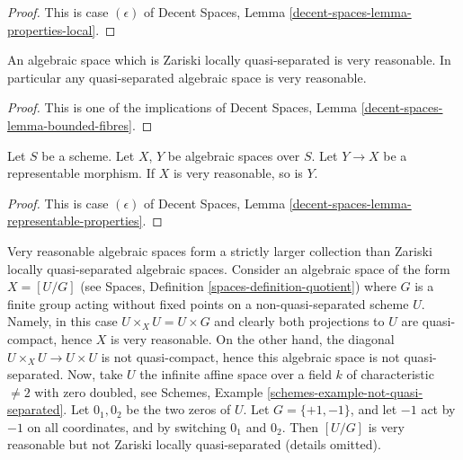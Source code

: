 \begin{proof}
This is case $(\epsilon)$ of
Decent Spaces, Lemma \ref{decent-spaces-lemma-properties-local}.
\end{proof}

\begin{lemma}
\label{lemma-quasi-separated-very-reasonable}
An algebraic space which is Zariski locally quasi-separated is very reasonable.
In particular any quasi-separated algebraic space is very reasonable.
\end{lemma}

\begin{proof}
This is one of the implications of
Decent Spaces, Lemma \ref{decent-spaces-lemma-bounded-fibres}.
\end{proof}

\begin{lemma}
\label{lemma-representable-very-reasonable}
Let $S$ be a scheme.
Let $X$, $Y$ be algebraic spaces over $S$.
Let $Y \to X$ be a representable morphism.
If $X$ is very reasonable, so is $Y$.
\end{lemma}

\begin{proof}
This is case $(\epsilon)$ of
Decent Spaces, Lemma \ref{decent-spaces-lemma-representable-properties}.
\end{proof}

\begin{remark}
\label{remark-very-reasonable-Zariski-locally-quasi-separated}
Very reasonable algebraic spaces form a strictly larger collection than
Zariski locally quasi-separated algebraic spaces. Consider
an algebraic space of the form $X = [U/G]$ (see
Spaces, Definition \ref{spaces-definition-quotient})
where $G$ is a finite group acting without fixed points on a
non-quasi-separated scheme $U$. Namely, in this case
$U \times_X U = U \times G$ and clearly both projections to $U$ are
quasi-compact, hence $X$ is very reasonable. On the other hand, the diagonal
$U \times_X U \to U \times U$ is not quasi-compact, hence this
algebraic space is not quasi-separated. Now, take $U$ the infinite
affine space over a field $k$ of characteristic $\not = 2$ with
zero doubled, see
Schemes, Example \ref{schemes-example-not-quasi-separated}.
Let $0_1, 0_2$ be the two zeros of $U$. Let $G = \{+1, -1\}$, and
let $-1$ act by $-1$ on all coordinates, and by switching
$0_1$ and $0_2$. Then $[U/G]$ is very reasonable but not Zariski locally
quasi-separated (details omitted).
\end{remark}

